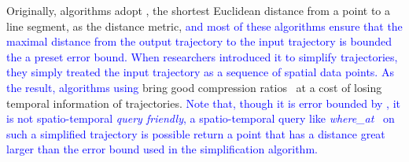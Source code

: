 Originally, \lsa algorithms adopt \ped, {the shortest Euclidean distance from a point to a line segment, as the distance metric, \textcolor{blue}{and most of these algorithms ensure that the maximal distance from the output trajectory to the input trajectory is bounded the a preset \ped error bound. When researchers introduced it to simplify trajectories, they simply treated the input trajectory as a sequence of spatial data points. As the result, \lsa algorithms using \ped} bring good compression ratios~\cite{Douglas:Peucker, Hershberger:Speeding, Liu:BQS, Muckell:Compression, Chen:Trajectory, Cao:Spatio, Shi:Survey} at a cost of losing temporal information of trajectories.} \textcolor{blue}{Note that, though it is error bounded by \ped, it is not spatio-temporal \emph{query friendly}, \ie a spatio-temporal query like \emph{where\_at}~\cite{Cao:Spatio} on such a simplified trajectory is possible return a point that has a distance great larger than the error bound used in the simplification algorithm.}

